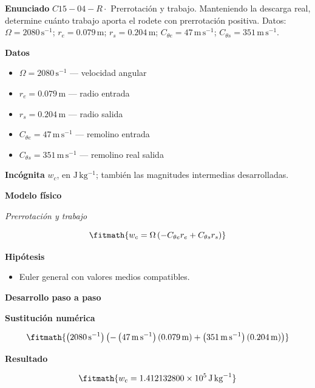 \documentclass[10pt,openany]{book}
\begin{document}
\begin{tcolorbox}[title={Problema resuelto 4}, studiumworked, breakable]

\noindent\textbf{Enunciado}
\(C15-04-R \cdot\) Prerrotación y trabajo. Manteniendo la descarga real, determine cuánto trabajo aporta el rodete con prerrotación positiva. Datos: \(\Omega=2080\, \mathrm{s}^{-1}\); \(r_e=0.079\, \mathrm{m}\); \(r_s=0.204\, \mathrm{m}\); \(C_{\theta e}=47\, \mathrm{m}\,\mathrm{s}^{-1}\); \(C_{\theta s}=351\, \mathrm{m}\,\mathrm{s}^{-1}\).

\noindent\textbf{Datos}
\begin{itemize}
\item $\Omega = 2080\,\mathrm{s}^{-1}$ — velocidad angular
\item $r_e = 0.079\,\mathrm{m}$ — radio entrada
\item $r_s = 0.204\,\mathrm{m}$ — radio salida
\item $C_{\theta e} = 47\,\mathrm{m}\,\mathrm{s}^{-1}$ — remolino entrada
\item $C_{\theta s} = 351\,\mathrm{m}\,\mathrm{s}^{-1}$ — remolino real salida
\end{itemize}

\noindent\textbf{Incógnita}
$w_c$, en $\mathrm{J\,kg^{-1}}$; también las magnitudes intermedias desarrolladas.

\noindent\textbf{Modelo físico}

\noindent\textit{Prerrotación y trabajo}

\[
\fitmath{w_c=\Omega \left(- C_{\theta e} r_e + C_{\theta s} r_s\right)}
\]

\noindent\textbf{Hipótesis}
\begin{itemize}
\item Euler general con valores medios compatibles.
\end{itemize}

\noindent\textbf{Desarrollo paso a paso}



\noindent\textbf{Sustitución numérica}

\[
\fitmath{\left(2080\,\mathrm{s}^{-1}\right) \left(- \left(47\,\mathrm{m}\,\mathrm{s}^{-1}\right) \left(0.079\,\mathrm{m}\right) + \left(351\,\mathrm{m}\,\mathrm{s}^{-1}\right) \left(0.204\,\mathrm{m}\right)\right)}
\]

\noindent\textbf{Resultado}

\[
\fitmath{w_c=1.412132800\times10^{5}\,\mathrm{J}\,\mathrm{kg}^{-1}}
\]


\end{tcolorbox}
\end{document}

